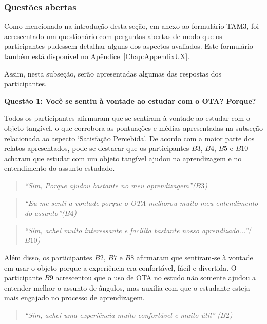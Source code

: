 \subsubsection{Questões abertas}\label{sub:TAM3-abertas}

Como mencionado na introdução desta seção, em anexo ao formulário TAM3, foi acrescentado um questionário com perguntas abertas de modo que os participantes pudessem detalhar alguns dos aspectos avaliados. Este formulário também está disponível no Apêndice~\ref{Chap:AppendixUX}.

Assim, nesta subseção, serão apresentadas algumas das respostas dos participantes.

\textbf{Questão 1: Você se sentiu à vontade ao estudar com o OTA? Porque?}

Todos os participantes afirmaram que se sentiram à vontade ao estudar com o objeto tangível, o que corrobora as pontuações e médias apresentadas na subseção relacionada ao aspecto `Satisfação Percebida'. De acordo com a maior parte dos relatos apresentados, pode-se destacar que os participantes $B3$, $B4$, $B5$ e $B10$ acharam que estudar com um objeto tangível ajudou na aprendizagem e no entendimento do assunto estudado.

\begin{quote}
	\textit{``Sim, Porque ajudou bastante no meu aprendizagem''($B3$)}
\end{quote}

\begin{quote}
	\textit{``Eu me senti a vontade porque o OTA melhorou muito meu entendimento do assunto''($B4$)}
\end{quote}

\begin{quote}
	\textit{``Sim, achei muito interessante e facilita bastante nosso aprendizado...''($B10$)}
\end{quote}

Além disso, os participantes $B2$, $B7$ e $B8$ afirmaram que sentiram-se à vontade em usar o objeto porque a experiência era confortável, fácil e divertida. O participante $B9$ acrescentou que o uso de OTA no estudo não somente ajudou a entender melhor o assunto de ângulos, mas auxilia com que o estudante esteja mais engajado no processo de aprendizagem.

\begin{quote}
\textit{``Sim, achei uma experiência muito confortável e muito útil'' ($B2$)}
\end{quote}

